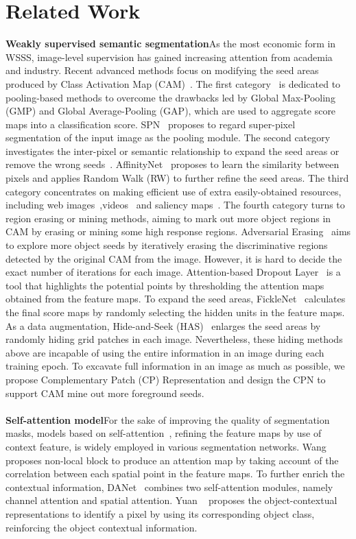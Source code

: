 \documentclass[10pt,twocolumn,letterpaper]{article}
\begin{document}
\section{Related Work}
\noindent\textbf{Weakly supervised semantic segmentation}\quad As the most economic form in WSSS, image-level supervision has gained increasing attention from academia and industry. Recent advanced methods focus on modifying the seed areas produced by Class Activation Map (CAM)~\cite{cam}. The first category~\cite{wildcat,sec,spx} is dedicated to pooling-based methods to overcome the drawbacks led by Global Max-Pooling (GMP) and Global Average-Pooling (GAP), which are used to aggregate score maps into a classification score. SPN~\cite{spx} proposes to regard super-pixel segmentation of the input image as the pooling module. The second category~\cite{dsrg,affinity,seam,1stage,coatten,irnet,erase2} investigates the inter-pixel or semantic relationship to expand the seed areas or remove the wrong seeds~\cite{conta}. AffinityNet~\cite{affinity} proposes to learn the similarity between pixels and applies Random Walk (RW) to further refine the seed areas. The third category concentrates on making efficient use of extra easily-obtained resources, including web images~\cite{video1},videos~\cite{video1,video2} and saliency maps~\cite{stc}. The fourth category turns to region erasing or mining methods, aiming to mark out more object regions in CAM by erasing or mining some high response regions. Adversarial Erasing~\cite{erase1} aims to explore more object seeds by iteratively erasing the discriminative regions detected by the original CAM from the image. However, it is hard to decide the exact number of iterations for each image. Attention-based Dropout Layer~\cite{adl} is a tool that highlights the potential points by thresholding the attention maps obtained from the feature maps. To expand the seed areas, FickleNet~\cite{fickle} calculates the final score maps by randomly selecting the hidden units in the feature maps. As a data augmentation, Hide-and-Seek (HAS)~\cite{has} enlarges the seed areas by randomly hiding grid patches in each image. Nevertheless, these hiding methods above are incapable of using the entire information in an image during each training epoch. To excavate full information in an image as much as possible, we propose Complementary Patch (CP) Representation and design the CPN to support CAM mine out more foreground seeds.
\\
\\
\noindent\textbf{Self-attention model}\quad For the sake of improving the quality of segmentation masks, models based on self-attention~\cite{attention}, refining the feature maps by use of context feature, is widely employed in various segmentation networks. Wang \etal~\cite{nonlocal} proposes non-local block to produce an attention map by taking account of the correlation between each spatial point in the feature maps. To further enrich the contextual information, DANet~\cite{DANet} combines two self-attention modules, namely channel attention and spatial attention. Yuan \etal~\cite{OCR} proposes the object-contextual representations to identify a pixel by using its corresponding object class, reinforcing the object contextual information.
\end{document}

